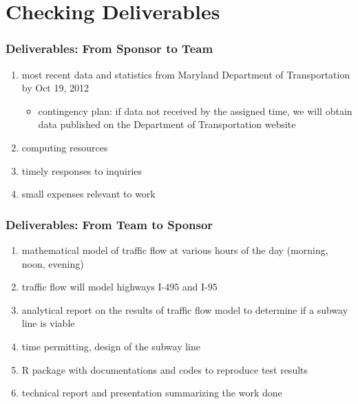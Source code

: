 \documentclass[compress,handout,10pt]{beamer}
\let\olditem\item
\renewcommand{\item}{\setlength{\itemsep}{0.5\baselineskip}\olditem}
\begin{document}
\section{Checking Deliverables}
\begin{frame}
    \frametitle{Deliverables: From Sponsor to Team}
    \begin{enumerate}
        \item most recent data and statistics from Maryland Department of Transportation by Oct 19, 2012
	\begin{itemize}
		\item contingency plan: if data not received by the assigned time, we will obtain data published on the Department of Transportation website
	\end{itemize}
	\item computing resources
	\item timely responses to inquiries
	\item small expenses relevant to work
    \end{enumerate}
\end{frame}

\begin{frame}
    \frametitle{Deliverables: From Team to Sponsor}
    \begin{enumerate}
        \item mathematical model of traffic flow at various hours of the day (morning, noon, evening)
	\item traffic flow will model highways I-495 and I-95
	\item analytical report on the results of traffic flow model to determine if a subway line is viable
	\item time permitting, design of the subway line
	\item R package with documentations and codes to reproduce test results
	\item technical report and presentation summarizing the work done
    \end{enumerate}
\end{frame}
\end{document}
